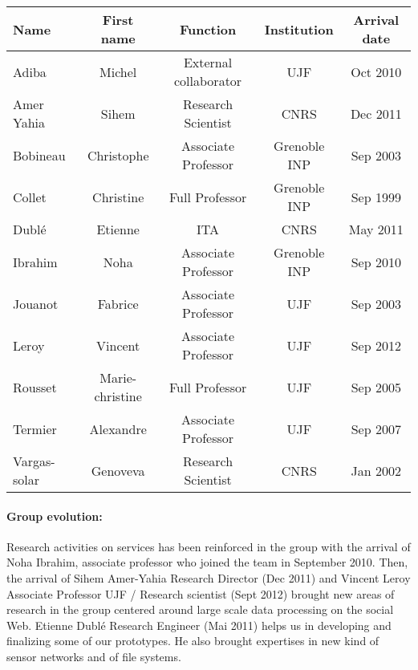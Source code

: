 
\begin{center}\begin{tabular}{|p{2.5cm}|*{4}{c|}}
\hline 
Name & First name & Function & Institution & Arrival date\\\hline \hline %
Adiba & Michel & External collaborator  & UJF & Oct 2010\\\hline
Amer Yahia & Sihem & Research Scientist & CNRS & Dec 2011  \\\hline
Bobineau & Christophe & Associate Professor & Grenoble INP & Sep 2003 \\\hline
Collet & Christine & Full Professor & Grenoble INP & Sep 1999 \\\hline
Dubl{\'e} & Etienne & ITA  & CNRS & May 2011\\\hline
Ibrahim & Noha & Associate Professor & Grenoble INP & Sep 2010  \\\hline
Jouanot & Fabrice & Associate Professor & UJF & Sep 2003 \\\hline
Leroy & Vincent & Associate Professor & UJF & Sep 2012 \\\hline
Rousset & Marie-christine & Full Professor & UJF & Sep 2005 \\\hline
Termier & Alexandre & Associate Professor & UJF & Sep 2007 \\\hline
Vargas-solar & Genoveva & Research Scientist & CNRS & Jan 2002 \\\hline
\hline
\end{tabular}\end{center}
\makeatother


\paragraph{Group evolution:}
Research activities on services has been reinforced in the group with the arrival of Noha Ibrahim, associate professor who joined the team in September 2010. 
Then, the arrival of Sihem Amer-Yahia Research Director (Dec 2011) and Vincent Leroy Associate Professor UJF / Research scientist (Sept 2012) brought new areas of research in the group centered around large scale data processing on the social Web.
Etienne Dubl{\'e} Research Engineer (Mai 2011) helps us in developing and finalizing some of our prototypes. He also brought expertises in new kind of sensor networks and of file systems. 

